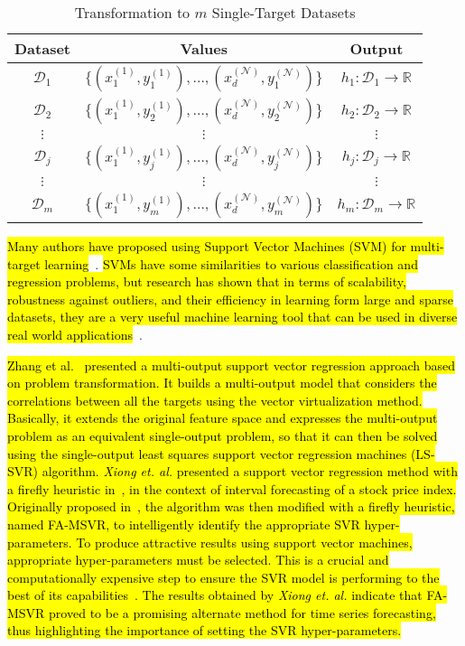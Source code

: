 \documentclass[preprint,12pt]{elsarticle}
\begin{document}
\begin{table}[!t]
\renewcommand{\arraystretch}{1.6}
\centering
\caption{Transformation to $m$ Single-Target Datasets}
\begin{tabular}{ccc}
\hline
Dataset & Values & Output \\
\hline
$\mathcal{D}_1$ & $\{(x_1^{(1)},y_1^{(1)}), \ldots, (x_d^{(\mathcal{N})},y_1^{(\mathcal{N})})\}$ & $h_1 : \mathcal{D}_1 \rightarrow \mathbb{R}$ \\
$\mathcal{D}_2$ & $\{(x_1^{(1)},y_2^{(1)}), \ldots, (x_d^{(\mathcal{N})},y_2^{(\mathcal{N})})\}$ & $h_2 : \mathcal{D}_2 \rightarrow \mathbb{R}$ \\
$\vdots$ & $\vdots$ & $\vdots$ \\
$\mathcal{D}_j$ & $\{(x_1^{(1)},y_j^{(1)}), \ldots, (x_d^{(\mathcal{N})},y_j^{(\mathcal{N})})\}$ & $h_j : \mathcal{D}_j \rightarrow \mathbb{R}$ \\
$\vdots$ & $\vdots$ & $\vdots$ \\
$\mathcal{D}_m$ & $\{(x_1^{(1)},y_m^{(1)}), \ldots, (x_d^{(\mathcal{N})},y_m^{(\mathcal{N})})\}$ & $h_m : \mathcal{D}_m \rightarrow \mathbb{R}$ \\
\hline
\end{tabular}
\label{tab:pt}
\end{table}

\hl{Many authors have proposed using Support Vector Machines (SVM) for multi-target learning}~\cite{Borchani2015,Xiong2014,Xu2013}. \hl{SVMs have some similarities to various classification and regression problems, but research has shown that in terms of scalability, robustness against outliers, and their efficiency in learning form large and sparse datasets, they are a very useful machine learning tool that can be used in diverse real world applications}~\cite{Chen20152502,Kecman,Melki2016,Zhu2017292}.

\hl{Zhang et al.{~\cite{Zhang2012}} presented a multi-output support vector regression approach based on problem transformation. It builds a multi-output model that considers the correlations between all the targets using the vector virtualization method. Basically, it extends the original feature space and expresses the multi-output problem as an equivalent single-output problem, so that it can then be solved using the single-output least squares support vector regression machines (LS-SVR) algorithm. \textit{Xiong et. al.} presented a support vector regression method with a firefly heuristic in{~\cite{Xiong2014}}, in the context of interval forecasting of a stock price index. Originally proposed in{~\cite{msvr}}, the algorithm was then modified with a firefly heuristic, named FA-MSVR, to intelligently identify the appropriate SVR hyper-parameters. To produce attractive results using support vector machines, appropriate hyper-parameters must be selected. This is a crucial and computationally expensive step to ensure the SVR model is performing to the best of its capabilities{~\cite{Zhao2015160}}. The results obtained by \textit{Xiong et. al.} indicate that FA-MSVR proved to be a promising alternate method for time series forecasting, thus highlighting the importance of setting the SVR hyper-parameters.}
\end{document}
